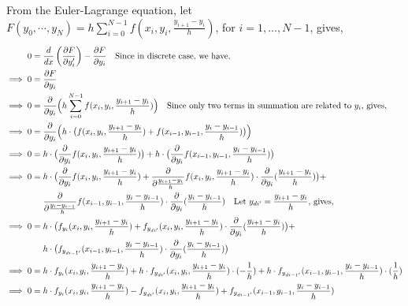 \documentclass[12pt]{article}
\begin{document}
From the Euler-Lagrange equation, let $F(y_0, \cdots, y_N) = h \sum_{i=0}^{N-1} f(x_i, y_i, \frac{y_{i+1} - y_i}{h})$, for $i = 1, ..., N-1$, gives, 
\begin{align*}
	0 &= \frac{d}{dx} \left( \frac{\partial F}{\partial y_i'} \right) - \frac{\partial F}{\partial y_i}  \quad \text{Since in discrete case, we have, }\\
	\implies 0 &= \frac{\partial F}{\partial y_i}  \\
	\implies 0 &= \frac{\partial }{\partial y_i} \Bigl( h \sum_{i=0}^{N-1} f(x_i, y_i, \frac{y_{i+1} - y_i}{h}) \Bigr) \quad \text{Since only two terms in summation are related to $y_i$, gives, } \\
	\implies 0 &= \frac{\partial }{\partial y_i} \Bigl(h \cdot \bigl(f(x_i, y_i, \frac{y_{i+1} - y_i}{h}) + f(x_{i-1}, y_{i-1}, \frac{y_i - y_{i-1}}{h}) \bigr) \Bigr)  \\
	\implies 0 &= h \cdot \bigl( \frac{\partial}{\partial y_i} f(x_i, y_i, \frac{y_{i+1} - y_i}{h}) \bigr) + h \cdot \bigl( \frac{\partial}{\partial y_i} f(x_{i-1}, y_{i-1}, \frac{y_i - y_{i-1}}{h}) \bigr)  \\
	\implies 0 &= h \cdot \bigl( \frac{\partial}{\partial y_i}f(x_i, y_i, \frac{y_{i+1} - y_i}{h}) + \frac{\partial}{\partial \frac{y_{i+1} - y_i}{h}}f(x_i, y_i, \frac{y_{i+1} - y_i}{h}) \cdot \frac{\partial}{\partial y_i} (\frac{y_{i+1} - y_i}{h}) \bigr) + \\
	&\quad \ \frac{\partial}{\partial \frac{y_i - y_{i-1}}{h}}f(x_{i-1}, y_{i-1}, \frac{y_i - y_{i-1}}{h}) \cdot \frac{\partial}{\partial y_i} (\frac{y_i - y_{i-1}}{h}) \quad \text{Let $y_{di'} = \frac{y_{i+1} - y_{i}}{h}$, gives, } \\
	\implies 0 &= h \cdot \bigl( f_{y_i}(x_i, y_i, \frac{y_{i+1} - y_i}{h}) + f_{y_{di'}}(x_i, y_i, \frac{y_{i+1} - y_i}{h}) \cdot \frac{\partial}{\partial y_i} (\frac{y_{i+1} - y_i}{h}) \bigr) + \\
	&\quad \ h \cdot \bigl( f_{y_{di-1'}}(x_{i-1}, y_{i-1}, \frac{y_i - y_{i-1}}{h}) \cdot \frac{\partial}{\partial y_i} (\frac{y_i - y_{i-1}}{h}) \bigr) \\
	\implies 0 &= h \cdot f_{y_i}(x_i, y_i, \frac{y_{i+1} - y_i}{h}) + h \cdot f_{y_{di'}}(x_i, y_i, \frac{y_{i+1} - y_i}{h}) \cdot (-\frac{1}{h} ) + h \cdot  f_{y_{di-1'}}(x_{i-1}, y_{i-1}, \frac{y_i - y_{i-1}}{h}) \cdot (\frac{1}{h} )\\
	\implies 0 &= h \cdot f_{y_i}(x_i, y_i, \frac{y_{i+1} - y_i}{h}) - f_{y_{di'}}(x_i, y_i, \frac{y_{i+1} - y_i}{h}) +  f_{y_{di-1'}}(x_{i-1}, y_{i-1}, \frac{y_i - y_{i-1}}{h})
\end{align*}
\end{document}
